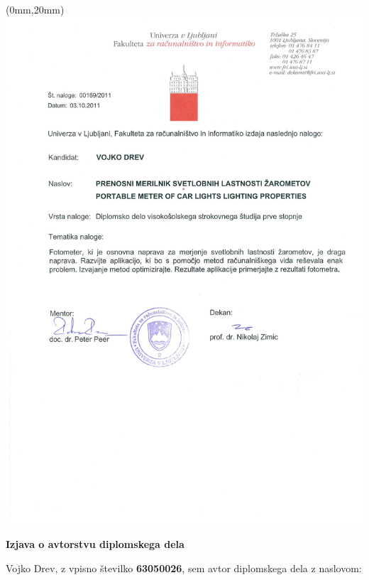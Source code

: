\documentclass[oneside, a4paper, 12pt]{book}
\newcommand{\clearemptydoublepage}{\newpage{\pagestyle{empty}\cleardoublepage}}
\begin{document}
\begin{textblock*}{297mm}(0mm,20mm)
        \includegraphics[keepaspectratio=true, width=19cm]{slike/orig-tema.pdf}
\end{textblock*}

\begin{center}

\end{center}

\clearemptydoublepage

\vspace*{1cm}
\begin{center} 
{\Large \textbf{\sc Izjava o avtorstvu diplomskega dela}}
\end{center}

\vspace{1cm}
\noindent Vojko Drev,
z vpisno številko \textbf{63050026}, sem avtor  diplomskega dela z 
naslovom:
   
\end{document}
